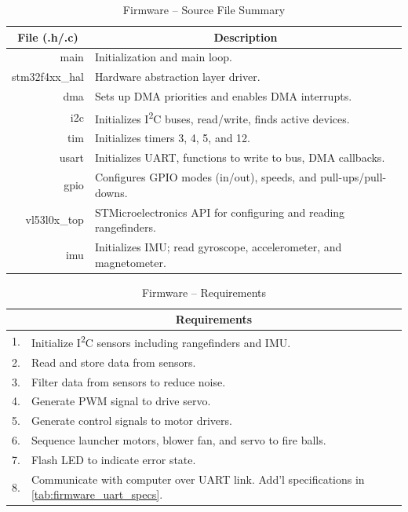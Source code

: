 \begin{table}[H]
	\centering	\caption{Firmware -- Source File Summary} 	\label{tab:firmware_file_desc}
	\begin{tabular}{r|l}
		\toprule 
		\multicolumn{1}{c}{File (.h/.c)} & \multicolumn{1}{c}{Description} \\ 
		\midrule 
		main & Initialization and main loop. \\  
		stm32f4xx\_hal & Hardware abstraction layer driver. \\  			
		dma & Sets up DMA priorities and enables DMA interrupts. \\  		
		i2c & Initializes I\textsuperscript{2}C buses, read/write, finds active devices. \\  		
		tim & Initializes timers 3, 4, 5, and 12. \\  		
		usart & Initializes UART, functions to write to bus, DMA callbacks. \\  		
		gpio & Configures GPIO modes (in/out), speeds, and pull-ups/pull-downs. \\  		
		vl53l0x\_top & STMicroelectronics API for configuring and reading rangefinders. \\  				 
		imu & Initializes IMU; read gyroscope, accelerometer, and magnetometer. \\ 
		\bottomrule 		
	\end{tabular} 
\end{table}
\begin{table}[H]
	\centering	\caption{Firmware -- Requirements} 	\label{tab:firmware_specs}
	\begin{tabular}{c|l}
		\toprule 
		 & \multicolumn{1}{c}{Requirements} \\ 
		 \midrule 
		1. & Initialize I\textsuperscript{2}C sensors including rangefinders and IMU. \\  
		2. & Read and store data from sensors. \\  
		3. & Filter data from sensors to reduce noise. \\  
		4. & Generate PWM signal to drive servo. \\  
		5. & Generate control signals to motor drivers. \\  
		6. & Sequence launcher motors, blower fan, and servo to fire balls. \\  
		7. & Flash LED to indicate error state. \\  
		8. & Communicate with computer over UART link. Add'l specifications in \ref{tab:firmware_uart_specs}. \\ \bottomrule 
	\end{tabular} 
\end{table}

